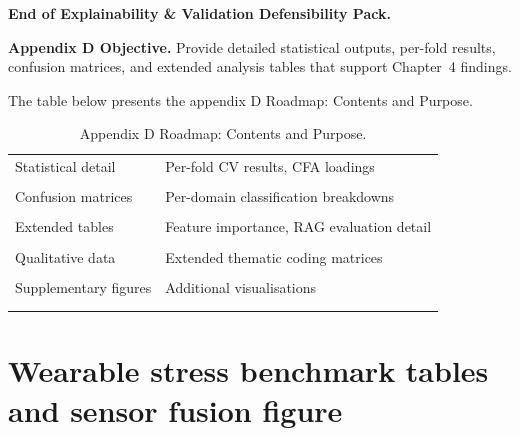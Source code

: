 \noindent\textbf{End of Explainability \& Validation Defensibility Pack.}

\label{fig:ch4_roc_curves}
\label{fig:rag_governance_layers}
\label{fig:appendix_ch4_taskflow}


\noindent\textbf{Appendix D Objective.} Provide detailed statistical outputs, per-fold results, confusion matrices, and extended analysis tables that support Chapter~4 findings.

\noindent The table below presents the appendix D Roadmap: Contents and Purpose.

\begin{table}[H]
\centering
\caption{Appendix D Roadmap: Contents and Purpose.}
\tablestripes\tablefontsize
\begin{tabularx}{\textwidth}{@{} >{\raggedright\arraybackslash}p{3.0cm} L @{}}
\toprule
{} &  \\
\midrule
Statistical detail & Per-fold CV results, CFA loadings \\\\\addlinespace
Confusion matrices & Per-domain classification breakdowns \\\\\addlinespace
Extended tables & Feature importance, RAG evaluation detail \\\\\addlinespace
Qualitative data & Extended thematic coding matrices \\\\\addlinespace
Supplementary figures & Additional visualisations \\\\\addlinespace
\bottomrule
\end{tabularx}
\end{table}


\section{Wearable stress benchmark tables and sensor fusion figure}


